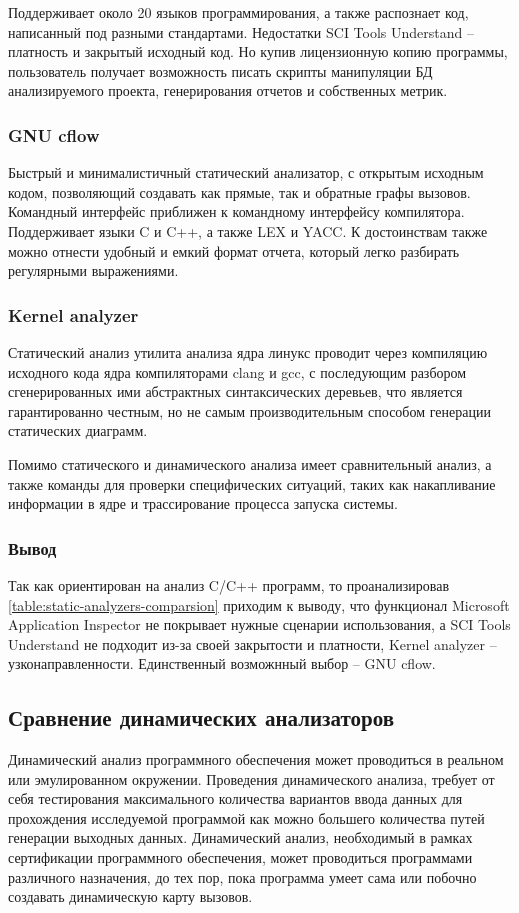 Поддерживает около 20 языков программирования, а также распознает код, написанный под разными 
стандартами.
Недостатки SCI Tools Understand -- платность и закрытый исходный код. Но купив лицензионную копию
программы, пользователь получает возможность писать скрипты манипуляции БД анализируемого проекта, 
генерирования отчетов и собственных метрик.

\subsubsection{GNU cflow}\label{sec:ch1/sec3/sub1/sub3}
Быстрый и минималистичный статический анализатор, с открытым исходным кодом,
позволяющий создавать как прямые, так и обратные графы вызовов. 
Командный интерфейс приближен к командному интерфейсу компилятора.
Поддерживает языки C и C++, а также LEX и YACC.
К достоинствам также можно отнести удобный и емкий формат отчета, который легко
разбирать регулярными выражениями.

\subsubsection{Kernel analyzer}\label{sec:ch1/sec3/sub1/sub3}
Статический анализ утилита анализа ядра линукс проводит через
компиляцию исходного кода ядра компиляторами clang и gcc, с последующим
разбором сгенерированных ими абстрактных синтаксических деревьев,
что является гарантированно честным, но не самым производительным способом
генерации статических диаграмм.

Помимо статического и динамического
анализа имеет сравнительный анализ,
а также команды для проверки специфических ситуаций,
таких как накапливание информации в ядре и 
трассирование процесса запуска системы.

\subsubsection{Вывод}\label{sec:ch1/sec3/sub1/sub4}
Так как {\ProgModule} ориентирован на анализ C/C++ программ, то проанализировав
\autoref{table:static-analyzers-comparsion} приходим к выводу, что функционал 
Microsoft Application Inspector не покрывает нужные сценарии использования, 
а SCI Tools Understand не подходит из-за своей закрытости и платности, Kernel analyzer -- узконаправленности.
Единственный возможнный выбор -- GNU cflow. 

\subsection{Сравнение динамических анализаторов}\label{sec:ch1/sec3/sub2}
Динамический анализ программного обеспечения может проводиться в реальном
или эмулированном окружении. Проведения динамического
анализа, требует от себя тестирования максимального количества вариантов
ввода данных для прохождения исследуемой программой как можно большего количества путей генерации 
выходных данных.
Динамический анализ, необходимый в рамках сертификации программного обеспечения, может проводиться
программами различного назначения, до тех пор, пока программа умеет сама или побочно
создавать динамическую карту вызовов.

